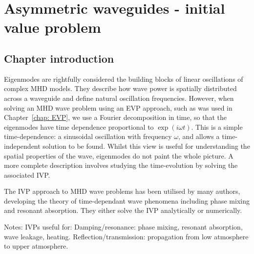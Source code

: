 \documentclass[12pt]{../style-files/ociamthesis}
\begin{document}
\baselineskip=18pt

\setcounter{secnumdepth}{3}
\setcounter{tocdepth}{3}

\setcounter{chapter}{3}

\newcommand{\figdir}{../main/figures/chpt-4/} %

\newcommand{\bv}{\mathbf{v}}
\newcommand{\bB}{\mathbf{B}}

\chapter{Asymmetric waveguides - initial value problem}
\label{chap: IVP}

\section{Chapter introduction}
\label{sec: IVP intro}

Eigenmodes are rightfully considered the building blocks of linear oscillations of complex MHD models. They describe how wave power is spatially distributed across a waveguide and define natural oscillation frequencies. However, when solving an MHD wave problem using an EVP approach, such as was used in Chapter~\ref{chap: EVP}, we use a Fourier decomposition in time, so that the eigenmodes have time dependence proportional to $\exp(i\omega t)$. This is a simple time-dependence: a sinusoidal oscillation with frequency $\omega$, and allows a time-independent solution to be found. Whilst this view is useful for understanding the spatial properties of the wave, eigenmodes do not paint the whole picture. A more complete description involves studying the time-evolution by solving the associated IVP.

The IVP approach to MHD wave problems has been utilised by many authors, developing the theory of time-dependant wave phenomena including phase mixing and resonant absorption. They either solve the IVP analytically or numerically. 

\color{red}
Notes:
IVPs useful for:
Damping/resonance: phase mixing, resonant absorption, wave leakage, heating.
Reflection/transmission: propagation from low atmosphere to upper atmosphere.
\end{document}
